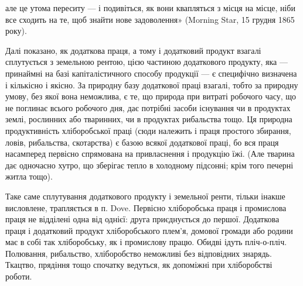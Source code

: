 \parcont{}  %
але це утома переситу — і подивіться, як вони квапляться з місця на місце,
ніби все сходить на те, щоб знайти нове задоволення» (Morning Star, 15 грудня
1865 року).

Далі показано, як додаткова праця, а тому і додатковий продукт взагалі
сплутується з земельною рентою, цією частиною додаткового продукту, яка —
принаймні на базі капіталістичного способу продукції — є специфічно визначена
і кількісно і якісно. За природну базу додаткової праці взагалі, тобто за
природну умову, без якої вона неможлива, є те, що природа при витраті робочого
часу, що не поглинає всього робочого дня, дає потрібні засоби існування
чи в продуктах землі, рослинних або тваринних, чи в продуктах рибальства тощо.
Ця природна продуктивність хліборобської праці (сюди належить і праця простого
збирання, ловів, рибальства, скотарства) є базою всякої додаткової праці, бо вся
праця насамперед первісно спрямована на привласнення і продукцію їжі. (Але
тварина дає одночасно хутро, що зберігає тепло в холодному підсонні; крім того
печерні житла тощо).

Таке саме сплутування додаткового продукту і земельної ренти, тільки
інакше висловлене, трапляється в п. Dove. Первісно хліборобська праця і промислова
праця не відділені одна від однієї: друга приєднується до першої.
Додаткова праця і додатковий продукт хліборобського плем’я, домової громади
або родини має в собі так хліборобську, як і промислову працю. Обидві ідуть
пліч-о-пліч. Полювання, рибальство, хліборобство неможливі без відповідних
знарядь. Ткацтво, прядіння тощо спочатку ведуться, як допоміжні при хліборобстві
роботи.

